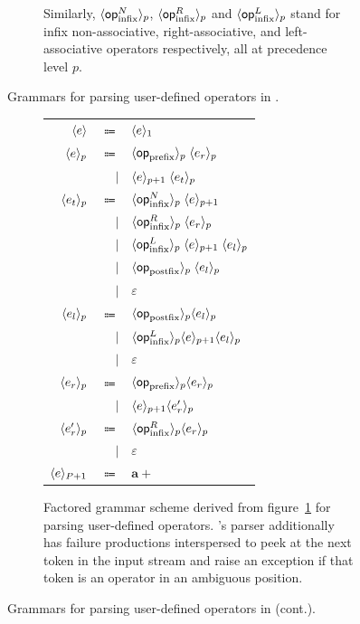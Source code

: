 {\begin{figure}[H]
\begin{subfigure}{\linewidth}
{Similarly, $ \langle\mathsf{op}_{\text{infix}}^N\rangle_p $, $ \langle\mathsf{op}_{\text{infix}}^R\rangle_p $ and $ \langle\mathsf{op}_{\text{infix}}^L\rangle_p $ stand for infix non-associative, right-associative, and left-associative operators respectively, all at precedence level $ p $.
}
\label{figure:user-defined-operators-initial-grammar-scheme}
\end{subfigure}
\caption[Grammars for parsing user-defined operators in \Beluga.]{Grammars for parsing user-defined operators in \Beluga.}
\label{figure:user-defined-operators-grammar}
\end{figure}%
\begin{figure}\ContinuedFloat
\begin{subfigure}{\linewidth}
\centering
\begin{tabular}{rrl}
$ \langle e\rangle $ & $ \Coloneqq $ & $ \langle e\rangle_1 $\\
$ \langle e\rangle_p $ & $ \Coloneqq $ & $ \langle\mathsf{op}_{\text{prefix}}\rangle_p \; \langle e_r\rangle_p $\\
& $ \mid $ & $ \langle e\rangle_{p + 1} \; \langle e_t\rangle_p $\\
$ \langle e_t\rangle_p $ & $ \Coloneqq $ & $ \langle\mathsf{op}_{\text{infix}}^N\rangle_p \; \langle e\rangle_{p + 1} $\\
& $ \mid $ & $ \langle\mathsf{op}_{\text{infix}}^R\rangle_p \; \langle e_r\rangle_p $\\
& $ \mid $ & $ \langle\mathsf{op}_{\text{infix}}^L\rangle_p \; \langle e\rangle_{p + 1} \; \langle e_l\rangle_p $\\
& $ \mid $ & $ \langle\mathsf{op}_{\text{postfix}}\rangle_p \; \langle e_l\rangle_p $\\
& $ \mid $ & $ \varepsilon $\\
$ \langle e_l\rangle_p $ & $ \Coloneqq $ & $ \langle\mathsf{op}_{\text{postfix}}\rangle_p \langle e_l\rangle_p $\\
& $ \mid $ & $ \langle\mathsf{op}_{\text{infix}}^L\rangle_p \langle e\rangle_{p + 1} \langle e_l\rangle_p $\\
& $ \mid $ & $ \varepsilon $\\
$ \langle e_r\rangle_p $ & $ \Coloneqq $ & $ \langle\mathsf{op}_{\text{prefix}}\rangle_p \langle e_r\rangle_p $\\
& $ \mid $ & $ \langle e\rangle_{p + 1} \langle e_r'\rangle_p $\\
$ \langle e_r'\rangle_p $ & $ \Coloneqq $ & $ \langle\mathsf{op}_{\text{infix}}^R\rangle_p \langle e_r\rangle_p $\\
& $ \mid $ & $ \varepsilon $\\
$ \langle e\rangle_{P + 1} $ & $ \Coloneqq $ & $ \mathbf{a}+ $
\end{tabular}
\caption{Factored grammar scheme derived from figure~\ref{figure:user-defined-operators-initial-grammar-scheme} for parsing user-defined operators.
\Beluga's parser additionally has failure productions interspersed to peek at the next token in the input stream and raise an exception if that token is an operator in an ambiguous position.}
\label{figure:user-defined-operators-final-grammar-scheme}
\end{subfigure}
\caption[]{Grammars for parsing user-defined operators in \Beluga (cont.).}
\end{figure}}

